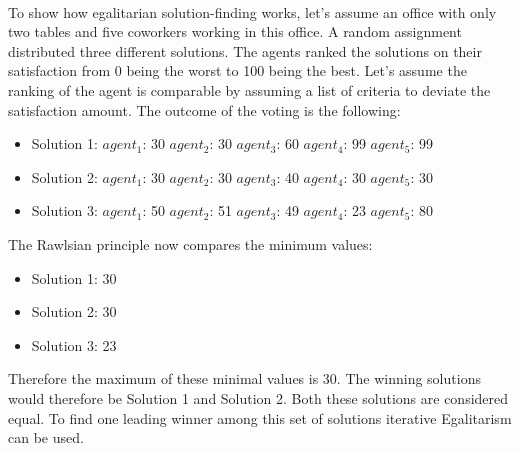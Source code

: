 \documentclass[german, a4paper, 11pt, oneside]{scrbook}
\begin{document}
\\To show how egalitarian solution-finding works, let's assume an office with only two tables and five coworkers working in this office. A random assignment distributed three different solutions. The agents ranked the solutions on their satisfaction from 0 being the worst to 100 being the best. Let's assume the ranking of the agent is comparable by assuming a list of criteria to deviate the satisfaction amount. The outcome of the voting is the following:
\begin{itemize}
\item Solution 1: $agent_1$: 30 $agent_2$: 30  $agent_3$: 60 $agent_4$: 99 $agent_5$: 99
\item Solution 2: $agent_1$: 30 $agent_2$: 30  $agent_3$: 40 $agent_4$: 30 $agent_5$: 30
\item Solution 3: $agent_1$: 50 $agent_2$: 51  $agent_3$: 49 $agent_4$: 23 $agent_5$: 80
\end{itemize}
The Rawlsian principle now compares the minimum values:
\begin{itemize}
\item Solution 1: 30 
\item Solution 2: 30 
\item Solution 3: 23
\end{itemize}
Therefore the maximum of these minimal values is 30. The winning solutions would therefore be Solution 1 and Solution 2. Both these solutions are considered equal. To find one leading winner among this set of solutions iterative Egalitarism can be used.
\end{document}
